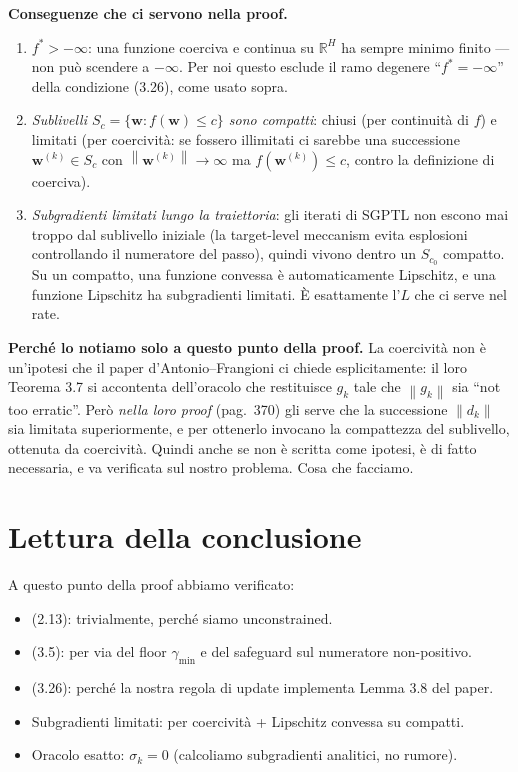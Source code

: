 \documentclass[11pt,a4paper]{article}
\newcommand{\R}{\mathbb{R}}
\newcommand{\norm}[1]{\left\|#1\right\|}
\newcommand{\bw}{\mathbf{w}}
\theoremstyle{definition}
\begin{document}
\begin{tcolorbox}[intuition,title=Cosa significa ``coerciva'' (per ELM LASSO, in concreto)]
\textbf{Conseguenze che ci servono nella proof.}
\begin{enumerate}[leftmargin=*]
\item \emph{$f^* > -\infty$}: una funzione coerciva e continua su $\R^H$ ha sempre minimo finito --- non può scendere a $-\infty$. Per noi questo esclude il ramo degenere ``$f^* = -\infty$'' della condizione (3.26), come usato sopra.
\item \emph{Sublivelli $S_c = \{\bw : f(\bw) \le c\}$ sono compatti}: chiusi (per continuità di $f$) e limitati (per coercività: se fossero illimitati ci sarebbe una successione $\bw^{(k)} \in S_c$ con $\norm{\bw^{(k)}}\to\infty$ ma $f(\bw^{(k)})\le c$, contro la definizione di coerciva).
\item \emph{Subgradienti limitati lungo la traiettoria}: gli iterati di SGPTL non escono mai troppo dal sublivello iniziale (la target-level meccanism evita esplosioni controllando il numeratore del passo), quindi vivono dentro un $S_{c_0}$ compatto. Su un compatto, una funzione convessa è automaticamente Lipschitz, e una funzione Lipschitz ha subgradienti limitati. È esattamente l'$L$ che ci serve nel rate.
\end{enumerate}

\textbf{Perché lo notiamo solo a questo punto della proof.} La coercività non è un'ipotesi che il paper d'Antonio--Frangioni ci chiede esplicitamente: il loro Teorema 3.7 si accontenta dell'oracolo che restituisce $g_k$ tale che $\norm{g_k}$ sia ``not too erratic''. Però \emph{nella loro proof} (pag.\ 370) gli serve che la successione $\norm{d_k}$ sia limitata superiormente, e per ottenerlo invocano la compattezza del sublivello, ottenuta da coercività. Quindi anche se non è scritta come ipotesi, è di fatto necessaria, e va verificata sul nostro problema. Cosa che facciamo.
\end{tcolorbox}

\section{Lettura della conclusione}

A questo punto della proof abbiamo verificato:
\begin{itemize}[leftmargin=*]
\item (2.13): trivialmente, perché siamo unconstrained.
\item (3.5): per via del floor $\gamma_{\min}$ e del safeguard sul numeratore non-positivo.
\item (3.26): perché la nostra regola di update implementa Lemma 3.8 del paper.
\item Subgradienti limitati: per coercività + Lipschitz convessa su compatti.
\item Oracolo esatto: $\sigma_k = 0$ (calcoliamo subgradienti analitici, no rumore).
\end{itemize}
\end{document}

